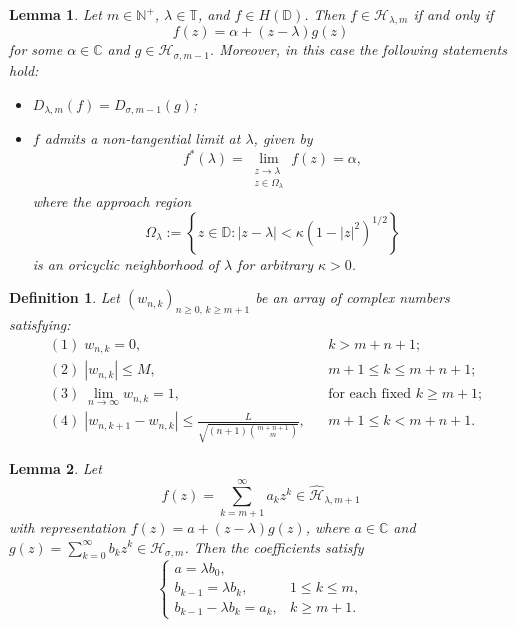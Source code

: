 \documentclass[10pt,a4paper]{amsart}
\newtheorem{lemma}{Lemma}
\newtheorem{definition}{Definition}
\begin{document}
\begin{lemma}\label{lm2.1}
Let \( m \in \mathbb{N}^{+} \), \( \lambda \in \mathbb{T} \), and \( f \in H(\mathbb{D}) \).
Then \( f \in \mathcal{H}_{\lambda,m} \) if and only if
\[
f(z) = \alpha + (z - \lambda)g(z)
\]
for some \( \alpha \in \mathbb{C} \) and \( g \in \mathcal{H}_{\sigma,m-1} \).
Moreover, in this case the following statements hold:
\begin{itemize}
\item[(i)] \( D_{\lambda,m}(f) = D_{\sigma,m-1}(g) \);
\item[(ii)] \( f \) admits a non-tangential limit at \( \lambda \), given by
\[
f^*(\lambda) = \lim_{\substack{z \to \lambda \\ z \in \Omega_\lambda}} f(z) = \alpha,
\]
where the approach region
\[
\Omega_\lambda := \left\{ z \in \mathbb{D} : |z - \lambda| < \kappa (1 - |z|^2)^{1/2} \right\}
\]
is an oricyclic neighborhood of \( \lambda \) for arbitrary \( \kappa > 0 \).
\end{itemize}
\end{lemma}

\begin{definition}\label{def4.1}
Let \( (w_{n,k})_{n \ge 0,\, k \ge m+1} \) be an array of complex numbers satisfying:
\begin{align}
&(1)\; w_{n,k}=0, && k>m+n+1; \tag{3.1}\\
&(2)\; |w_{n,k}|\le M, && m+1\le k\le m+n+1; \tag{3.2}\\
&(3)\; \lim_{n\to\infty} w_{n,k}=1, && \text{for each fixed } k\ge m+1; \tag{3.3}\\
&(4)\; |w_{n,k+1}-w_{n,k}|
\le \frac{L}{\sqrt{(n+1)\binom{m+n+1}{m}}}, && m+1\le k<m+n+1. \tag{3.4}
\end{align}
\end{definition}

\begin{lemma}\label{lm4.2}
Let
\[
f(z)=\sum_{k=m+1}^{\infty} a_k z^k \in \widehat{\mathcal{H}}_{\lambda,m+1}
\]
with representation $f(z)=a+(z-\lambda)g(z)$,
where $a\in\mathbb{C}$ and $g(z)=\sum_{k=0}^{\infty} b_k z^k \in \mathcal{H}_{\sigma,m}$.
Then the coefficients satisfy
\[
\begin{cases}
a=\lambda b_0,\\
b_{k-1}=\lambda b_k, & 1\le k\le m,\\
b_{k-1}-\lambda b_k=a_k, & k\ge m+1.
\end{cases}
\]
\end{lemma}
\end{document}
